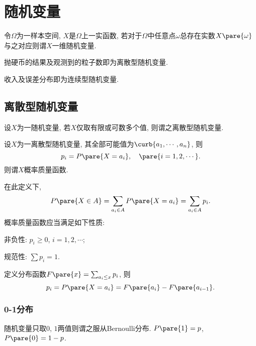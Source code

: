 \documentclass{ctexart}
\begin{document}
\section{随机变量} %
\label{sec:随机变量}

\begin{definition}[随机变量]
    令$\Omega$为一样本空间, $X$是$\Omega$上一实函数, 若对于$\Omega$中任意点$\omega$总存在实数$X\pare{\omega}$与之对应则谓$X$一维随机变量.
\end{definition}
\begin{ex}[离散型随机变量]
    抛硬币的结果及观测到的粒子数即为离散型随机变量.
\end{ex}
\begin{ex}[连续型随机变量]
    收入及误差分布即为连续型随机变量.
\end{ex}

\subsection{离散型随机变量} %
\label{sub:离散型随机变量}

\begin{definition}[离散型随机变量]
    设$X$为一随机变量, 若$X$仅取有限或可数多个值, 则谓之离散型随机变量.
\end{definition}
\begin{definition}[概率质量函数]
    设$X$为一离散型随机变量, 其全部可能值为$\curb{a_1,\cdots,a_n}$, 则
    \[ p_i = P\pare{X=a_i},\quad \pare{i = 1,2,\cdots}. \]
    则谓$X$概率质量函数.
\end{definition}
在此定义下,
\[ P\pare{X\in A} = \sum_{a_i\in A}P\pare{X=a_i} = \sum_{a_i\in A} p_i. \]
概率质量函数应当满足如下性质:
\begin{cenum}
    \item 非负性: $p_i \ge 0$, $i = 1,2,\cdots$;
    \item 规范性: $\displaystyle \sum p_i = 1$.
\end{cenum}
定义分布函数$F\pare{x} = \sum_{a_i\le x} p_i$, 则
\[ p_i = P\pare{X=a_i} = F\pare{a_i} - F\pare{a_{i-1}}. \]

\subsubsection{0-1分布} %
\label{ssub:0_1分布}

随机变量只取$0$, $1$两值则谓之服从Bernoulli分布. $P\pare{1} = p$, $P\pare{0} = 1-p$.

\end{document}
